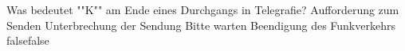     {Was bedeutet ""K"" am Ende eines Durchgangs in Telegrafie?}
    {Aufforderung zum Senden}
    {Unterbrechung der Sendung}
    {Bitte warten}
    {Beendigung des Funkverkehrs}
    {false}{false}